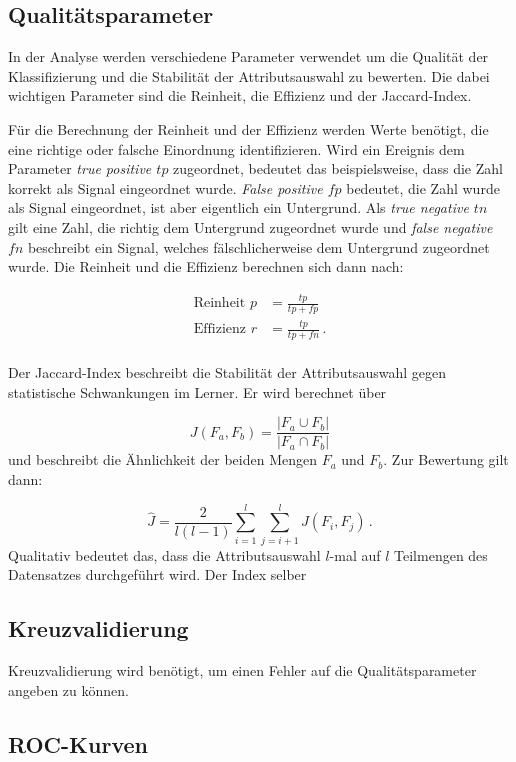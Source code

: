 \subsection{Qualitätsparameter}
In der Analyse werden verschiedene Parameter verwendet um die Qualität der Klassifizierung 
und die Stabilität der Attributsauswahl zu bewerten. Die dabei wichtigen Parameter 
sind die Reinheit, die Effizienz und der Jaccard-Index. \par 
Für die Berechnung der Reinheit und der Effizienz werden Werte benötigt, die 
eine richtige oder falsche Einordnung identifizieren. Wird ein Ereignis dem 
Parameter \textit{true positive $tp$} zugeordnet, bedeutet das beispielsweise,
dass die Zahl korrekt als Signal eingeordnet wurde. \textit{False positive $fp$} 
bedeutet, die Zahl wurde als Signal eingeordnet, ist aber eigentlich ein
Untergrund. Als \textit{true negative $tn$} gilt eine Zahl, die richtig dem Untergrund 
zugeordnet wurde und \textit{false negative $fn$} beschreibt ein Signal, welches 
fälschlicherweise dem Untergrund zugeordnet wurde. Die Reinheit und die Effizienz 
berechnen sich dann nach:

\begin{align*}
    \text{Reinheit}\, \, p &= \frac{tp}{tp + fp} \\ 
    \text{Effizienz}\, \, r &= \frac{tp}{tp + fn} \, .\\ 
\end{align*}

Der Jaccard-Index beschreibt die Stabilität der Attributsauswahl gegen statistische 
Schwankungen im Lerner. Er wird berechnet über 

\begin{equation*}
    J \left(F_a, F_b \right) = \frac{|F_a \cup F_b|}{|F_a \cap F_b|}
\end{equation*}
und beschreibt die Ähnlichkeit der beiden Mengen $F_a$ und $F_b$. Zur Bewertung 
gilt dann: 

\begin{equation*}
    \hat{J} = \frac{2}{l \left(l - 1 \right)} \sum\limits_{i = 1}^{l}\sum\limits_{j = i+1}^{l} J\left(F_i, F_j \right) \, .
\end{equation*}
Qualitativ bedeutet das, dass die Attributsauswahl $l$-mal auf $l$ Teilmengen des Datensatzes durchgeführt wird. Der Index 
selber 

\subsection{Kreuzvalidierung}

Kreuzvalidierung wird benötigt, um einen Fehler auf die Qualitätsparameter angeben zu 
können.

\subsection{ROC-Kurven}